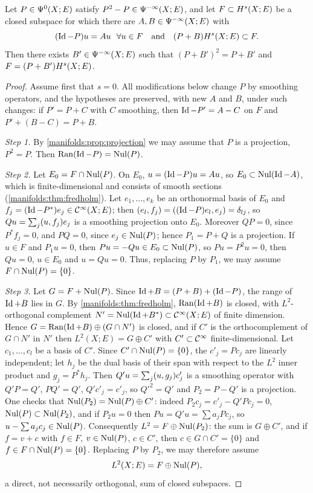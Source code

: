 \begin{proposition}\label{manifolds:prop:range-projection}
Let $P\in\Psi^{0}(X;E)$ satisfy $P^2-P\in\Psi^{-\infty}(X;E)$, and let $F\subset H^{s}(X;E)$ be a
closed subspace for which there are $A,B\in\Psi^{-\infty}(X;E)$ with
\begin{equation*}
(\operatorname{Id}-P)u=Au\ \ \forall u\in F\quad\text{and}\quad(P+B)H^{s}(X;E)\subset F.
\end{equation*}
Then there exists $B'\in\Psi^{-\infty}(X;E)$ such that $(P+B')^2=P+B'$ and
$F=(P+B')H^{s}(X;E)$.
\end{proposition}
\begin{proof}
Assume first that $s=0$. All modifications below change $P$ by smoothing operators,
and the hypotheses are preserved, with new $A$ and $B$, under such changes: if
$P'=P+C$ with $C$ smoothing, then $\operatorname{Id}-P'=A-C$ on $F$ and $P'+(B-C)=P+B$.

\emph{Step 1.} By \cref{manifolds:prop:projection} we may assume that $P$ is a projection,
$P^2=P$. Then $\operatorname{Ran}(\operatorname{Id}-P)=\operatorname{Nul}(P)$.

\emph{Step 2.} Let $E_0=F\cap\operatorname{Nul}(P)$. On $E_0$, $u=(\operatorname{Id}-P)u=Au$, so $E_0\subset\operatorname{Nul}(\operatorname{Id}-A)$,
which is finite-dimensional and consists of smooth sections
(\cref{manifolds:thm:fredholm}). Let $e_1,\dots,e_k$ be an orthonormal basis of $E_0$ and
$f_j=(\operatorname{Id}-P^*)e_j\in\mathcal{C}^\infty(X;E)$; then $( e_l, f_j)=( (\operatorname{Id}-P)e_l, e_j)=\delta_{lj}$, so
$Qu=\sum_j( u, f_j)e_j$ is a smoothing projection onto $E_0$. Moreover $QP=0$, since
$P^*f_j=0$, and $PQ=0$, since $e_j\in\operatorname{Nul}(P)$; hence $P_1=P+Q$ is a projection. If $u\in F$
and $P_1u=0$, then $Pu=-Qu\in E_0\subset\operatorname{Nul}(P)$, so $Pu=P^2u=0$, then $Qu=0$, $u\in E_0$ and
$u=Qu=0$. Thus, replacing $P$ by $P_1$, we may assume $F\cap\operatorname{Nul}(P)=\{0\}$.

\emph{Step 3.} Let $G=F+\operatorname{Nul}(P)$. Since $\operatorname{Id}+B=(P+B)+(\operatorname{Id}-P)$, the range of $\operatorname{Id}+B$ lies
in $G$. By \cref{manifolds:thm:fredholm}, $\operatorname{Ran}(\operatorname{Id}+B)$ is closed, with $L^2$-orthogonal
complement $N'=\operatorname{Nul}(\operatorname{Id}+B^*)\subset\mathcal{C}^\infty(X;E)$ of finite dimension. Hence
$G=\operatorname{Ran}(\operatorname{Id}+B)\oplus(G\cap N')$ is closed, and if $C'$ is the orthocomplement of $G\cap N'$
in $N'$ then $L^2(X;E)=G\oplus C'$ with $C'\subset\mathcal{C}^\infty$ finite-dimensional. Let
$c_1,\dots,c_l$ be a basis of $C'$. Since $C'\cap\operatorname{Nul}(P)=\{0\}$, the $c'_j=Pc_j$ are linearly
independent; let $h_j$ be the dual basis of their span with respect to the $L^2$ inner product
and $g_j=P^*h_j$. Then $Q'u=\sum_j( u, g_j)c'_j$ is a smoothing operator with $Q'P=Q'$,
$PQ'=Q'$, $Q'c'_j=c'_j$, so $Q'^2=Q'$ and $P_2=P-Q'$ is a projection. One checks that
$\operatorname{Nul}(P_2)=\operatorname{Nul}(P)\oplus C'$: indeed $P_2c_j=c'_j-Q'Pc_j=0$, $\operatorname{Nul}(P)\subset\operatorname{Nul}(P_2)$, and if
$P_2u=0$ then $Pu=Q'u=\sum a_jPc_j$, so $u-\sum a_jc_j\in\operatorname{Nul}(P)$. Consequently
$L^2=F\oplus\operatorname{Nul}(P_2)$: the sum is $G\oplus C'$, and if $f=v+c$ with $f\in F$, $v\in\operatorname{Nul}(P)$,
$c\in C'$, then $c\in G\cap C'=\{0\}$ and $f\in F\cap\operatorname{Nul}(P)=\{0\}$. Replacing $P$ by $P_2$, we may
therefore assume
\begin{equation}\label{manifolds:eq:direct-sum}
L^2(X;E)=F\oplus\operatorname{Nul}(P),
\end{equation}
a direct, not necessarily orthogonal, sum of closed subspaces.


\end{proof}

